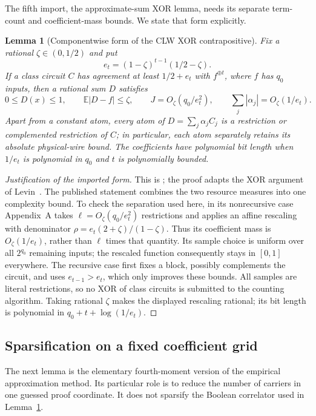 \documentclass[11pt,letterpaper]{article}
\newtheorem{lemma}[theorem]{Lemma}
\theoremstyle{definition}
\theoremstyle{remark}
\begin{document}
The fifth import, the approximate-sum XOR lemma, needs its separate
term-count and coefficient-mass bounds. We state that form explicitly.

\begin{lemma}[Componentwise form of the CLW XOR contrapositive]
\label{tr:xor}
Fix a rational $\zeta\in(0,1/2)$ and put
\[
 e_t=(1-\zeta)^{t-1}(1/2-\zeta).
\]
If a class circuit $C$ has agreement at least $1/2+e_t$ with
$f^{\oplus t}$, where $f$ has $q_0$ inputs, then a rational sum $D$
satisfies
\[
 0\le D(x)\le1,\qquad \mathbb E|D-f|\le\zeta,
 \qquad J=O_\zeta(q_0/e_t^2),\qquad
 \sum_j|\alpha_j|=O_\zeta(1/e_t).
\]
Apart from a constant atom, every atom of $D=\sum_j\alpha_j C_j$
is a restriction or complemented restriction of $C$; in particular,
each atom separately retains its absolute physical-wire bound.
The coefficients have polynomial bit length when $1/e_t$ is polynomial
in $q_0$ and $t$ is polynomially bounded.
\end{lemma}

\begin{proof}[Justification of the imported form]
This is \cite[Lemma~3.8 and Appendix~A]{CLW}; the proof adapts the
XOR argument of Levin~\cite{Levin}. The published statement combines
the two resource measures into one complexity bound. To check the
separation used here, in its nonrecursive case Appendix~A takes
$\ell=O_\zeta(q_0/e_t^2)$ restrictions and applies an affine
rescaling with denominator
$\rho=e_t(2+\zeta)/(1-\zeta)$. Thus its coefficient mass is
$O_\zeta(1/e_t)$, rather than $\ell$ times that quantity.
Its sample choice is uniform over all $2^{q_0}$ remaining inputs;
the rescaled function consequently stays in $[0,1]$ everywhere.
The recursive case first fixes a block, possibly complements the
circuit, and uses $e_{t-1}>e_t$, which only improves these bounds.
All samples are literal restrictions, so no XOR of class circuits
is submitted to the counting algorithm. Taking rational $\zeta$
makes the displayed rescaling rational; its bit length is polynomial
in $q_0+t+\log(1/e_t)$.
\end{proof}

\subsection{Sparsification on a fixed coefficient grid}
\label{tr:sparse-section}

The next lemma is the elementary fourth-moment version of the empirical
approximation method. Its particular role is to reduce the number of
carriers in one guessed proof coordinate. It does not sparsify the
Boolean correlator used in Lemma~\ref{tr:xor}.
\end{document}
